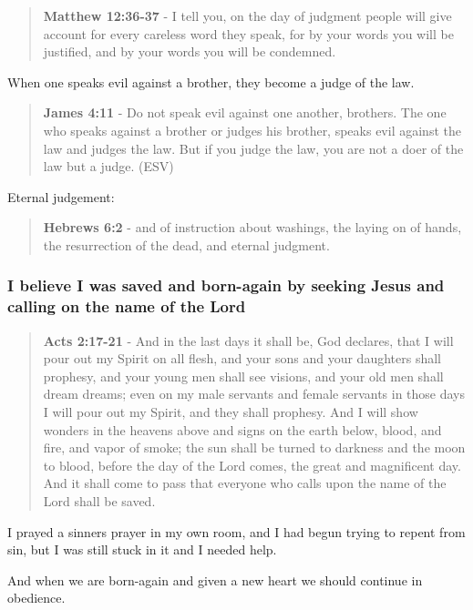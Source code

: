 \documentclass[11pt]{article}
\begin{document}
\begin{quote}
\textbf{Matthew 12:36-37} - I tell you, on the day of judgment people will give account for every careless word they speak, for by your words you will be justified, and by your words you will be condemned.
\end{quote}

When one speaks evil against a brother, they become a judge of the law.

\begin{quote}
\textbf{James 4:11} - Do not speak evil against one another, brothers. The one who speaks against a brother or judges his brother, speaks evil against the law and judges the law. But if you judge the law, you are not a doer of the law but a judge. (ESV)
\end{quote}

Eternal judgement:

\begin{quote}
\textbf{Hebrews 6:2} - and of instruction about washings, the laying on of hands, the resurrection of the dead, and eternal judgment.
\end{quote}

\subsubsection{I believe I was saved and born-again by seeking Jesus and calling on the name of the Lord}
\label{sec:org953b36f}

\begin{quote}
\textbf{Acts 2:17-21} - And in the last days it shall be, God declares, that I will pour out my Spirit on all flesh, and your sons and your daughters shall prophesy, and your young men shall see visions, and your old men shall dream dreams; even on my male servants and female servants in those days I will pour out my Spirit, and they shall prophesy. And I will show wonders in the heavens above and signs on the earth below, blood, and fire, and vapor of smoke; the sun shall be turned to darkness and the moon to blood, before the day of the Lord comes, the great and magnificent day. And it shall come to pass that everyone who calls upon the name of the Lord shall be saved.
\end{quote}

I prayed a sinners prayer in my own room, and I had begun trying to repent from sin, but I was still stuck in it and I needed help.

And when we are born-again and given a new heart we should continue in obedience.
\end{document}
